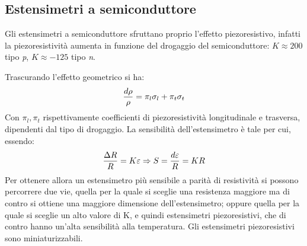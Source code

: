 \documentclass[a4paper, 15pt]{article}
\begin{document}
\subsection{Estensimetri a semiconduttore}		
\begin{adjustwidth}{2in}{}			
		Gli estensimetri a semiconduttore sfruttano proprio l'effetto piezoresistivo, infatti la piezoresistività aumenta in funzione del drogaggio del semiconduttore: $ K\approx200 $ tipo \textit{p}, $ K\approx-125 $ tipo \textit{n}.\newline
		
		Trascurando l'effetto geometrico si ha:
		\[{d\rho\over\rho} = \pi_l\sigma_l + \pi_t\sigma_t\]
		Con $ \pi_l, \pi_t$ rispettivamente coefficienti di piezoresistività longitudinale e trasversa, dipendenti dal tipo di drogaggio. 
		La sensibilità dell'estensimetro è tale per cui, essendo:
		\[{\Delta R\over R} = K\varepsilon \Rightarrow S = {d\varepsilon\over R} = KR\]
		Per ottenere allora un estensimetro più sensibile a parità di resistività si possono percorrere due vie, quella per la quale si sceglie una resistenza maggiore ma di contro si ottiene una maggiore dimensione dell'estensimetro; oppure quella per la quale si sceglie un alto valore di K, e quindi estensimetri piezoresistivi, che di contro hanno un'alta sensibilità alla temperatura. Gli estensimetri piezoresistivi sono miniaturizzabili. \newline 
		

\end{adjustwidth}
\end{document}
